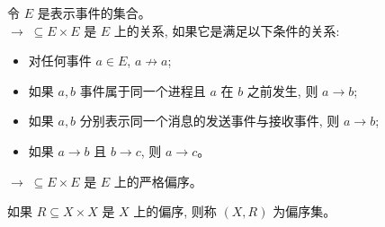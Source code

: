 \begin{frame}{}
  \begin{center}
  \end{center}
\end{frame}

\begin{frame}{}
\end{frame}

\begin{frame}{}
  \begin{definition}
    令 $E$ 是表示事件的集合。\\[3pt]
    $\to \;\subseteq E \times E$ 是 $E$ 上的关系,
    如果它是满足以下条件的关系: \\[5pt]
    \begin{itemize}
      \setlength{\itemsep}{8pt}
      \item 对任何事件 $a \in E$, $a \not\to a$;
      \item 如果 $a, b$ 事件属于同一个进程且 $a$ 在 $b$ 之前发生, 则 $a \to b$;
      \item 如果 $a, b$ 分别表示同一个消息的发送事件与接收事件, 则 $a \to b$;
      \item 如果 $a \to b$ 且 $b \to c$, 则 $a \to c$。
    \end{itemize}
  \end{definition}

  \pause
  \vspace{0.30cm}
  \begin{theorem}
    $\to \;\subseteq E \times E$ 是 $E$ 上的严格偏序。
  \end{theorem}
\end{frame}

\begin{frame}{}
  \begin{definition}
    如果 $R \subseteq X \times X$ 是 $X$ 上的偏序,
    则称 $(X, R)$ 为偏序集。
  \end{definition}
\end{frame}
